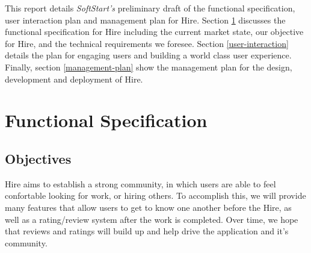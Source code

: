 \documentclass[11pt]{article}
\begin{document}

This report details \textit{SoftStart's} preliminary draft of the functional specification, user interaction plan and management plan for Hire. Section \ref{functional-spec} discusses the functional specification for Hire including the current market state, our objective for Hire, and the technical requirements we foresee. Section \ref{user-interaction} details the plan for engaging users and building a world class user experience. Finally, section \ref{management-plan} show the management plan for the design, development and deployment of Hire.

%
\section{Functional Specification}\label{functional-spec}



\subsection{Objectives}

Hire aims to establish a strong community, in which users are able to feel confortable looking for work, or hiring others. To accomplish this, we will provide many features that allow users to get to know one another before the Hire, as well as a rating/review system after the work is completed. Over time, we hope that reviews and ratings will build up and help drive the application and it's community.
\end{document}
